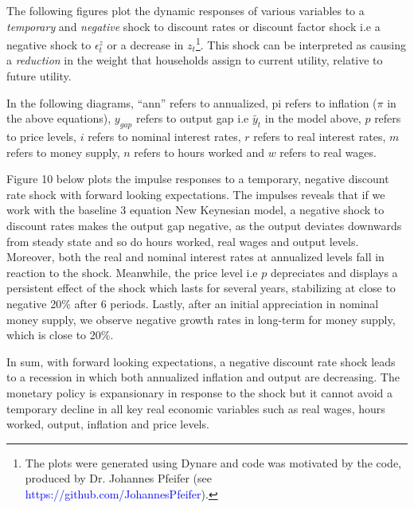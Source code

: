 \documentclass[12pt]{article}
\newcommand{\1}{\mathbbm 1}
\begin{document}
The following figures plot the dynamic responses of various variables to a \textit{temporary} and \textit{negative} shock to discount rates or discount factor shock i.e a negative shock to $\epsilon_{t}^{z}$ or a decrease in $z_{t}$\footnote{The plots were generated using Dynare and code was motivated by the code, produced by Dr. Johannes Pfeifer (see \textcolor{blue}{https://github.com/JohannesPfeifer}).}. This shock can be interpreted as causing a \textit{reduction} in the weight that households assign to current utility, relative to future utility. 

In the following diagrams, ``ann'' refers to annualized, pi refers to inflation ($\pi$ in the above equations), $y_{gap}$ refers to output gap i.e $\widetilde{y_{t}}$ in the model above, $p$ refers to price levels, $i$ refers to nominal interest rates, $r$ refers to real interest rates, $m$ refers to money supply, $n$ refers to hours worked and $w$ refers to real wages.

Figure 10 below plots the impulse responses to a temporary, negative discount rate shock with forward looking expectations. The impulses reveals that if we work with the baseline 3 equation New Keynesian model, a negative shock to discount rates makes the output gap negative, as the output deviates downwards from steady state and so do hours worked, real wages and output levels. Moreover, both the real and nominal interest rates at annualized levels fall in reaction to the shock. Meanwhile, the price level i.e $p$ depreciates and displays a persistent effect of the shock which lasts for several years, stabilizing at close to negative 20\% after 6 periods. Lastly, after an initial appreciation in nominal money supply, we observe negative growth rates in long-term for money supply, which is close to 20\%.


In sum, with forward looking expectations, a negative discount rate shock leads to a recession in which both annualized inflation and output are decreasing. The monetary policy is expansionary in response to the shock but it cannot avoid a temporary decline in all key real economic variables such as real wages, hours worked, output, inflation and price levels.














	
\end{document}
